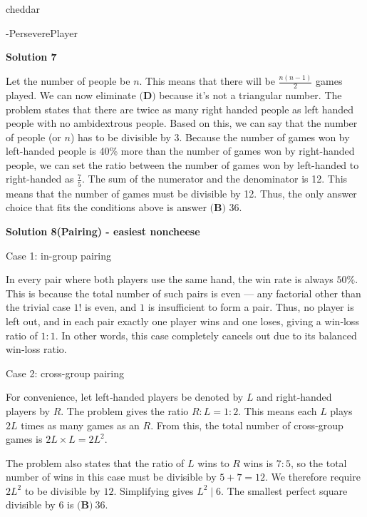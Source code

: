 \begin{enumerate}
 cheddar

 -PerseverePlayer

 



\textbf{Solution 7}

Let the number of people be $n$. This means that there will be $\frac{n(n-1)}{2}$ games played. We can now eliminate $\textbf{(D)}$ because it's not a triangular number. The problem states that there are twice as many right handed people as left handed people with no ambidextrous people. Based on this, we can say that the number of people (or $n$) has to be divisible by 3. Because the number of games won by left-handed people is 40\% more than the number of games won by right-handed people, we can set the ratio between the number of games won by left-handed to right-handed as $\frac{7}{5}$. The sum of the numerator and the denominator is 12. This means that the number of games must be divisible by 12. Thus, the only answer choice that fits the conditions above is answer $\boxed{\textbf{(B) }36}$.

 



\textbf{Solution 8(Pairing) - easiest noncheese}

Case 1: in-group pairing

 
In every pair where both players use the same hand, the win rate is always \(50\%\). This is because the total number of such pairs is even — any factorial other than the trivial case \(1!\) is even, and \(1\) is insufficient to form a pair. Thus, no player is left out, and in each pair exactly one player wins and one loses, giving a win‑loss ratio of \(1:1\). In other words, this case completely cancels out due to its balanced win‑loss ratio.

 
Case 2: cross-group pairing

 
For convenience, let left‑handed players be denoted by \(L\) and right‑handed players by \(R\). The problem gives the ratio \(R : L = 1 : 2\). This means each \(L\) plays \(2L\) times as many games as an \(R\). From this, the total number of cross‑group games is \(2L \times L = 2L^2\).

 The problem also states that the ratio of \(L\) wins to \(R\) wins is \(7:5\), so the total number of wins in this case must be divisible by \(5 + 7 = 12\). We therefore require \(2L^2\) to be divisible by \(12\). Simplifying gives \(L^2 \mid 6\). The smallest perfect square divisible by \(6\) is \(\boxed{\textbf{(B)}\ 36}\).


\end{enumerate}
